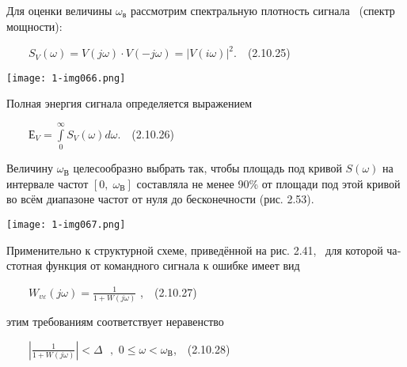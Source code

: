 \documentclass[a4paper]{article}
\begin{document}
{\begin{russian}\sffamily
Для оценки величины  $ω_в$ рассмотрим спектральную плотность сигнала \ (спектр мощности):
\end{russian}}

{\begin{russian}\sffamily
\ \ \ \  $S_V(ω)=V(\mathit{jω})\cdot V(-\mathit{jω})=|V(\mathit{iω})|^2$.\ \ (2.10.25)
\end{russian}}

{\centering  \texttt{[image: 1-img066.png]} \par}
{\begin{russian}\sffamily
Полная энергия сигнала определяется выражением
\end{russian}}

{\begin{russian}\sffamily
\ \ \ \  $Е_V=\overset{\infty }{\underset 0{\int }}S_V(ω)\mathit{dω}.$\ \  (2.10.26)
\end{russian}}

{\begin{russian}\sffamily
Величину  $ω_В$ целесообразно выбрать так, чтобы площадь под кривой  $S(ω)$ на интервале частот  $[0,\;ω_В]$ составляла
не менее 90\% от площади под этой кривой во всём диапазоне частот от нуля до бесконечности (рис. 2.53).
\end{russian}}

{\centering  \texttt{[image: 1-img067.png]} \par}
{\begin{russian}\sffamily
Применительно к структурной схеме, приведённой на рис. 2.41, \ для которой частотная функция от командного сигнала к
ошибке имеет вид
\end{russian}}

{\begin{russian}\sffamily
\ \ \ \  $W_{\mathit{vε}}(\mathit{jω})=\frac 1{1+W(\mathit{jω})}$ ,\ \ (2.10.27)
\end{russian}}

{\begin{russian}\sffamily
этим требованиям соответствует неравенство
\end{russian}}

{\begin{russian}\sffamily
\ \ \ \  $|\frac 1{1+W(\mathit{jω})}|<Δ\text{    },\text{      0}\le ω<ω_В$,\ \ (2.10.28)
\end{russian}}


\bigskip
\end{document}
